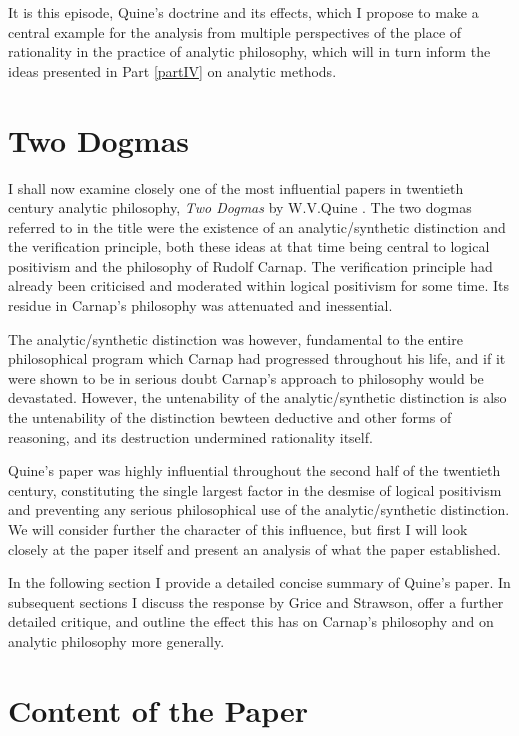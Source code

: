 It is this episode, Quine's doctrine and its effects, which I propose to make a central example for the analysis from multiple perspectives of the place of rationality in the practice of analytic philosophy, which will in turn inform the ideas presented in Part \ref{partIV} on analytic methods.

\section{Two Dogmas}

I shall now examine closely one of the most influential papers in twentieth century analytic philosophy, \emph{Two Dogmas} by W.V.Quine \cite{quine51}.
The two dogmas referred to in the title were the existence of an analytic/synthetic distinction and the verification principle, both these ideas at that time being central to logical positivism and the philosophy of Rudolf Carnap.
The verification principle had already been criticised and moderated within logical positivism for some time.
Its residue in Carnap's philosophy was attenuated and inessential.

The analytic/synthetic distinction was however, fundamental to the entire philosophical program which Carnap had progressed throughout his life, and if it were shown to be in serious doubt Carnap's approach to philosophy would be devastated.
However, the untenability of the analytic/synthetic distinction is also the untenability of the distinction bewteen deductive and other forms of reasoning, and its destruction undermined rationality itself.

Quine's paper was highly influential throughout the second half of the twentieth century, constituting the single largest factor in the desmise of logical positivism and preventing any serious philosophical use of the analytic/synthetic distinction.
We will consider further the character of this influence, but first I will look closely at the paper itself and present an analysis of what the paper established.

In the following section I provide a detailed concise summary of Quine's paper.
In subsequent sections I discuss the response by Grice and Strawson, offer a further detailed critique, and outline the effect this has on Carnap's philosophy and on analytic philosophy more generally.

\section{Content of the Paper}

